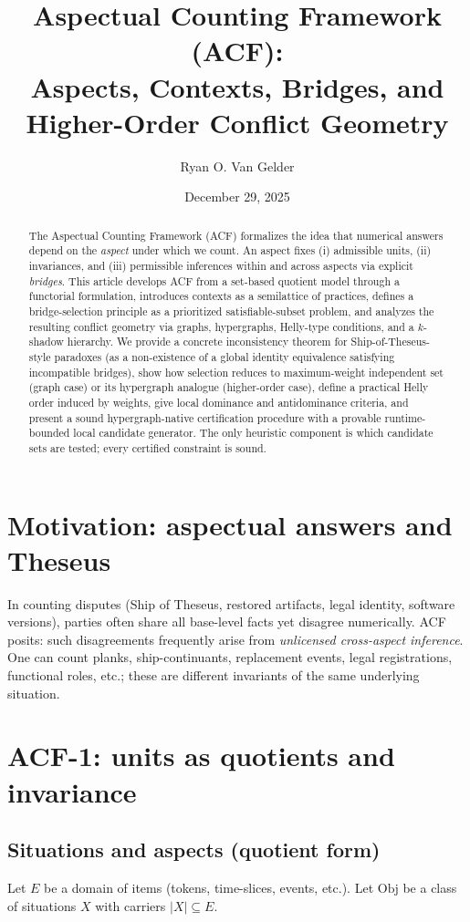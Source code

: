 \documentclass[11pt]{article}
\title{Aspectual Counting Framework (ACF):\\
Aspects, Contexts, Bridges, and Higher-Order Conflict Geometry}
\author{Ryan O. Van Gelder}
\date{December 29, 2025}
\theoremstyle{definition}
\theoremstyle{plain}
\theoremstyle{remark}
\newcommand{\Obj}{\mathrm{Obj}}
\begin{document}
\maketitle

\begin{abstract}
The Aspectual Counting Framework (ACF) formalizes the idea that numerical answers depend on the \emph{aspect} under which we count. An aspect fixes (i) admissible units, (ii) invariances, and (iii) permissible inferences within and across aspects via explicit \emph{bridges}. This article develops ACF from a set-based quotient model through a functorial formulation, introduces contexts as a semilattice of practices, defines a bridge-selection principle as a prioritized satisfiable-subset problem, and analyzes the resulting conflict geometry via graphs, hypergraphs, Helly-type conditions, and a $k$-shadow hierarchy. We provide a concrete inconsistency theorem for Ship-of-Theseus-style paradoxes (as a non-existence of a global identity equivalence satisfying incompatible bridges), show how selection reduces to maximum-weight independent set (graph case) or its hypergraph analogue (higher-order case), define a practical Helly order induced by weights, give local dominance and antidominance criteria, and present a sound hypergraph-native certification procedure with a provable runtime-bounded local candidate generator. The only heuristic component is which candidate sets are tested; every certified constraint is sound.
\end{abstract}

\tableofcontents

\section{Motivation: aspectual answers and Theseus}
In counting disputes (Ship of Theseus, restored artifacts, legal identity, software versions), parties often share all base-level facts yet disagree numerically. ACF posits: such disagreements frequently arise from \emph{unlicensed cross-aspect inference}. One can count planks, ship-continuants, replacement events, legal registrations, functional roles, etc.; these are different invariants of the same underlying situation.

\section{ACF-1: units as quotients and invariance}

\subsection{Situations and aspects (quotient form)}
Let $E$ be a domain of items (tokens, time-slices, events, etc.). Let $\Obj$ be a class of situations $X$ with carriers $|X|\subseteq E$.
\end{document}

